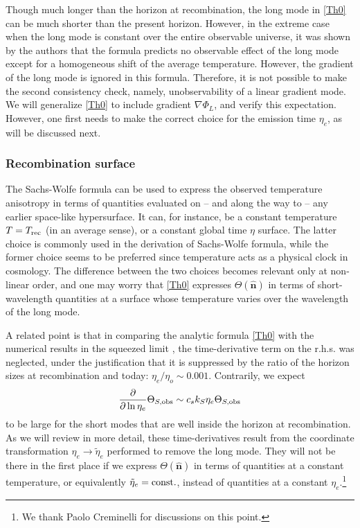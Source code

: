 \documentclass[12pt]{article}
\numberwithin{equation}{section}
\def\bsb{\boldsymbol}
\def\be{\begin{equation}}
\def\ee{\end{equation}}
\def\d{\partial}
\begin{document}
Though much longer than the horizon at recombination, the long mode in \eqref{Th0} can be much shorter than the present horizon. However, in the extreme case when the long mode is constant over the entire observable universe, it was shown by the authors that the formula predicts no observable effect of the long mode except for a homogeneous shift of the average temperature. However, the gradient of the long mode is ignored in this formula. Therefore, it is not possible to make the second consistency check, namely, unobservability of a linear gradient mode. We will generalize \eqref{Th0} to include gradient $\nabla \Phi_L$, and verify this expectation. However, one first needs to make the correct choice for the emission time $\eta_e$, as will be discussed next. 

\subsubsection{Recombination surface}

The Sachs-Wolfe formula can be used to express the observed temperature anisotropy in terms of quantities evaluated on -- and along the way to -- any earlier space-like hypersurface. It can, for instance, be a constant temperature $T=T_{\rm rec}$ (in an average sense), or a constant global time $\eta$ surface. The latter choice is commonly used in the derivation of Sachs-Wolfe formula, while the former choice seems to be preferred since temperature acts as a physical clock in cosmology. The difference between the two choices becomes relevant only at non-linear order, and one may worry that \eqref{Th0} expresses $\Theta(\bsb{\hat n})$ in terms of short-wavelength quantities at a surface whose temperature varies over the wavelength of the long mode. 

A related point is that in comparing the analytic formula \eqref{Th0} with the numerical results in the squeezed limit \cite{Creminelli_squeezed,Huang}, the time-derivative term on the r.h.s. was neglected, under the justification that it is suppressed by the ratio of the horizon sizes at recombination and today: $\eta_e/\eta_o \sim 0.001$. Contrarily, we expect
\be
\frac{\d}{\d\ln\eta_e}\Theta_{S,\rm obs} \sim c_s k_S\eta_e \Theta_{S,\rm obs}
\ee
to be large for the short modes that are well inside the horizon at recombination. As we will review in more detail, these time-derivatives result from the coordinate transformation $\eta_e \to \tilde \eta_e$ performed to remove the long mode. They will not be there in the first place if we express $\Theta(\bsb{\hat n})$ in terms of quantities at a constant temperature, or equivalently $\tilde \eta_e =\rm const.$, instead of quantities at a constant $\eta_e$.\footnote{We thank Paolo Creminelli for discussions on this point.}
\end{document}
